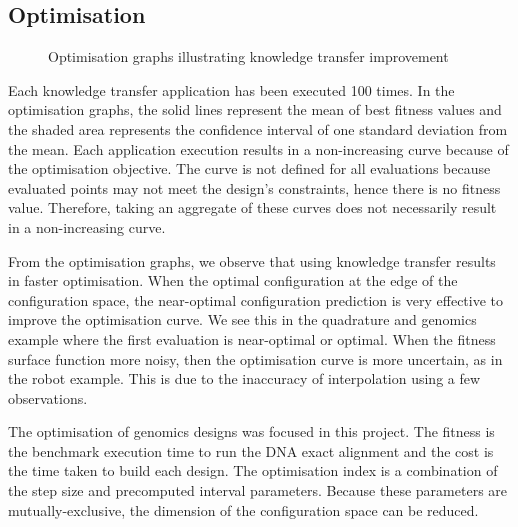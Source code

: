 \documentclass[10pt,a4paper]{article}
\begin{document}
\subsection{Optimisation}

\begin{figure}[H]
	 \begin{center}
	\end{center}
	\caption{Optimisation graphs illustrating knowledge transfer improvement}
	\label{fig:subfigures}
\end{figure}

Each knowledge transfer application has been executed 100 times. In the optimisation graphs, the solid lines represent the mean of best fitness values and the shaded area represents the confidence interval of one standard deviation from the mean. Each application execution results in a non-increasing curve because of the optimisation objective. The curve is not defined for all evaluations because evaluated points may not meet the design's constraints, hence there is no fitness value. Therefore, taking an aggregate of these curves does not necessarily result in a non-increasing curve.

From the optimisation graphs, we observe that using knowledge transfer results in faster optimisation. When the optimal configuration at the edge of the configuration space, the near-optimal configuration prediction is very effective to improve the optimisation curve. We see this in the quadrature and genomics example where the first evaluation is near-optimal or optimal. When the fitness surface function more noisy, then the optimisation curve is more uncertain, as in the robot example. This is due to the inaccuracy of interpolation using a few observations.

The optimisation of genomics designs was focused in this project. The fitness is the benchmark execution time to run the DNA exact alignment and the cost is the time taken to build each design. The optimisation index is a combination of the step size and precomputed interval parameters. Because these parameters are mutually-exclusive, the dimension of the configuration space can be reduced.
\end{document}
